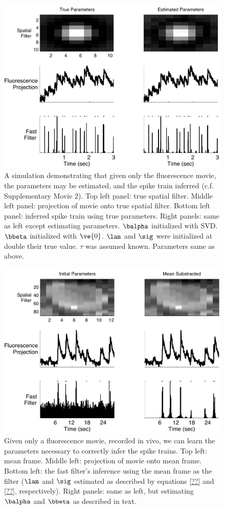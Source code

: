 \begin{figure}
\centering \includegraphics[width=.9\linewidth]{spatial_EM}
\caption{A simulation demonstrating that given only the fluorescence movie, the parameters may be estimated, and the spike train inferred (c.f. Supplementary Movie 2). Top left panel: true spatial filter.  Middle left panel: projection of movie onto true spatial filter. Bottom left panel: inferred spike train using true parameters. Right panels: same as left except estimating parameters.  $\balpha$ initialized with SVD.  $\bbeta$ initialized with $\ve{0}$.  $\lam$ and $\sig$ were initialized at double their true value.  $\tau$ was assumed known. Parameters same as above.} \label{fig:spatial_EM}
\end{figure}

\begin{figure}
\centering \includegraphics[width=.9\linewidth]{spatial_data}
\caption{Given only a fluorescence movie, recorded in vivo, we can learn the parameters necessary to correctly infer the spike trains. Top left: mean frame.  Middle left: projection of movie onto mean frame. Bottom left: the fast filter's inference using the mean frame as the filter ($\lam$ and $\sig$ estimated as described by equations \eqref{??} and \eqref{??}, respectively).  Right panels: same as left, but estimating $\balpha$ and $\bbeta$ as described in text.} \label{fig:spatial_data}
\end{figure}

